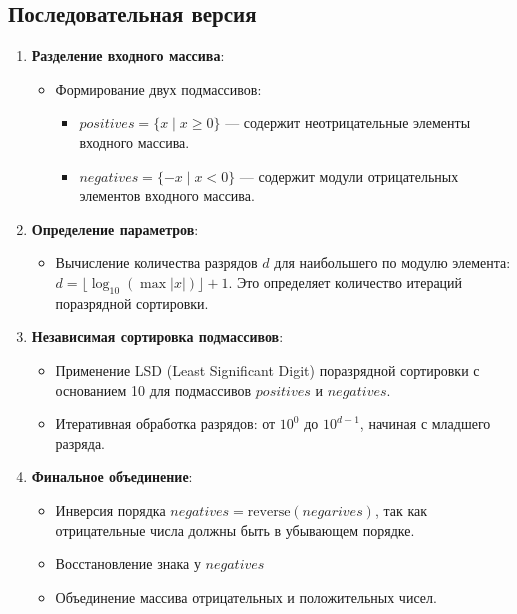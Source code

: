 \documentclass[12pt,a4paper]{extarticle}
\begin{document}
	\subsection{Последовательная версия}
\begin{enumerate}
    \item \textbf{Разделение входного массива}:
    \begin{itemize}
        \item Формирование двух подмассивов:
        \begin{itemize}
            \item $positives = \{ x \mid x \geq 0 \}$ — содержит неотрицательные элементы входного массива.
            \item $negatives = \{ -x \mid x < 0 \}$ — содержит модули отрицательных элементов входного массива.
        \end{itemize}
    \end{itemize}
    
    \item \textbf{Определение параметров}:
    \begin{itemize}
        \item Вычисление количества разрядов $d$ для наибольшего по модулю элемента: $d = \lfloor \log_{10}(\max |x|) \rfloor + 1$. Это определяет количество итераций поразрядной сортировки.
    \end{itemize}
    
    \item \textbf{Независимая сортировка подмассивов}:
    \begin{itemize}
        \item Применение LSD (Least Significant Digit) поразрядной сортировки с основанием 10 для подмассивов $positives$ и $negatives$.
        \item Итеративная обработка разрядов: от $10^0$ до $10^{d-1}$, начиная с младшего разряда.
    \end{itemize}
    
    \item \textbf{Финальное объединение}:
    \begin{itemize}
        \item Инверсия порядка $negatives = \mathrm{reverse}(negarives)$, так как отрицательные числа должны быть в убывающем порядке.
        \item Восстановление знака у $negatives$
        \item Объединение массива отрицательных и положительных чисел.
    \end{itemize}
\end{enumerate}
\end{document}
